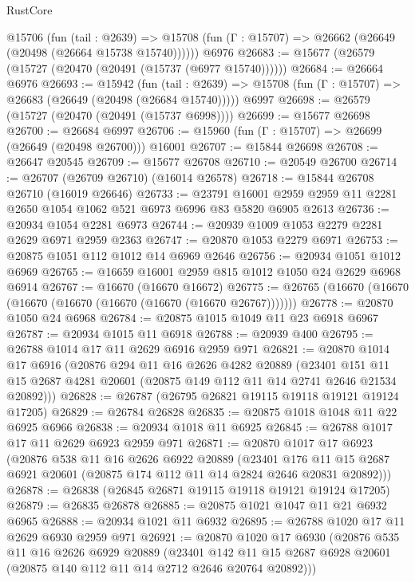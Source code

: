 \begin{lexlean}{RustCore}
\begin{coremodule}
    @15706
      (fun (tail : @2639) =>
      @15708 (fun (Γ : @15707) => @26662 (@26649 (@20498 (@26664 @15738 @15740))))))
    @6976
@26683 := @15677 (@26579 (@15727 (@20470 (@20491 (@15737 (@6977 @15740))))))
@26684 := @26664 @6976
@26693 := @15942
    (fun (tail : @2639) => @15708 (fun (Γ : @15707) => @26683 (@26649 (@20498 (@26684 @15740)))))
    @6997
@26698 := @26579 (@15727 (@20470 (@20491 (@15737 @6998))))
@26699 := @15677 @26698
@26700 := @26684 @6997
@26706 := @15960 (fun (Γ : @15707) => @26699 (@26649 (@20498 @26700))) @16001
@26707 := @15844 @26698
@26708 := @26647 @20545
@26709 := @15677 @26708
@26710 := @20549 @26700
@26714 := @26707 (@26709 @26710) (@16014 @26578)
@26718 := @15844 @26708 @26710 (@16019 @26646)
@26733 := @23791
    @16001
    @2959
    @2959
    @11
    @2281
    @2650
    @1054
    @1062
    @521
    @6973
    @6996
    @83
    @5820
    @6905
    @2613
@26736 := @20934 @1054 @2281 @6973
@26744 := @20939 @1009 @1053 @2279 @2281 @2629 @6971 @2959 @2363
@26747 := @20870 @1053 @2279 @6971
@26753 := @20875 @1051 @112 @1012 @14 @6969 @2646
@26756 := @20934 @1051 @1012 @6969
@26765 := @16659 @16001 @2959 @815 @1012 @1050 @24 @2629 @6968 @6914
@26767 := @16670 (@16670 @16672)
@26775 := @26765 (@16670 (@16670 (@16670 (@16670 (@16670 (@16670 (@16670 @26767)))))))
@26778 := @20870 @1050 @24 @6968
@26784 := @20875 @1015 @1049 @11 @23 @6918 @6967
@26787 := @20934 @1015 @11 @6918
@26788 := @20939 @400
@26795 := @26788 @1014 @17 @11 @2629 @6916 @2959 @971
@26821 := @20870
    @1014
    @17
    @6916
    (@20876
      @294
      @11
      @16
      @2626
      @4282
      @20889
      (@23401 @151 @11 @15 @2687 @4281 @20601 (@20875 @149 @112 @11 @14 @2741 @2646 @21534 @20892)))
@26828 := @26787 (@26795 @26821 @19115 @19118 @19121 @19124 @17205)
@26829 := @26784 @26828
@26835 := @20875 @1018 @1048 @11 @22 @6925 @6966
@26838 := @20934 @1018 @11 @6925
@26845 := @26788 @1017 @17 @11 @2629 @6923 @2959 @971
@26871 := @20870
    @1017
    @17
    @6923
    (@20876
      @538
      @11
      @16
      @2626
      @6922
      @20889
      (@23401 @176 @11 @15 @2687 @6921 @20601 (@20875 @174 @112 @11 @14 @2824 @2646 @20831 @20892)))
@26878 := @26838 (@26845 @26871 @19115 @19118 @19121 @19124 @17205)
@26879 := @26835 @26878
@26885 := @20875 @1021 @1047 @11 @21 @6932 @6965
@26888 := @20934 @1021 @11 @6932
@26895 := @26788 @1020 @17 @11 @2629 @6930 @2959 @971
@26921 := @20870
    @1020
    @17
    @6930
    (@20876
      @535
      @11
      @16
      @2626
      @6929
      @20889
      (@23401 @142 @11 @15 @2687 @6928 @20601 (@20875 @140 @112 @11 @14 @2712 @2646 @20764 @20892)))

\end{coremodule}
\end{lexlean}
